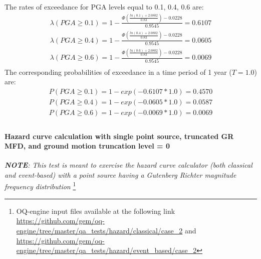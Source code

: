 The rates of exceedance for PGA levels equal to 0.1, 0.4, 0.6 are:
\begin{eqnarray}
\lambda(PGA \geq 0.1) = 1 - \frac{\Phi(\frac{ln(0.1) + 2.0802} {0.83}) -0.0228}
					{0.9545} = 0.6107 \nonumber \\
\lambda(PGA \geq 0.4) = 1 - \frac{\Phi(\frac{ln(0.4) + 2.0802} {0.83}) -0.0228}
					{0.9545} = 0.0605 \nonumber \\
\lambda(PGA \geq 0.6) = 1 - \frac{\Phi(\frac{ln(0.6) + 2.0802} {0.83}) -0.0228}
					{0.9545} = 0.0069 \nonumber \\
\end{eqnarray}
The corresponding probabilities of exceedance in a time period of 1 year ($T=1.0$) are:
\begin{eqnarray}
P(PGA \geq 0.1) = 1 - exp(- 0.6107 * 1.0) = 0.4570 \nonumber \\
P(PGA \geq 0.4) = 1 - exp(- 0.0605 * 1.0) = 0.0587 \nonumber \\
P(PGA \geq 0.6) = 1 - exp(- 0.0069 * 1.0) = 0.0069 \nonumber \\
\end{eqnarray}
%
\clearpage
%
\paragraph{Hazard curve calculation with single point source, 
truncated GR MFD, and ground motion truncation level = 0}
\textit{\textbf{NOTE}: This test is meant to exercise the hazard curve
    calculator (both classical and event-based) with a point source
    having a Gutenberg Richter magnitude frequency distribution} \footnote{
    OQ-engine input files available at the following link
    \url{https://github.com/gem/oq-engine/tree/master/qa_tests/hazard/classical/case_2}
    and 
    \url{https://github.com/gem/oq-engine/tree/master/qa_tests/hazard/event_based/case_2}
}

